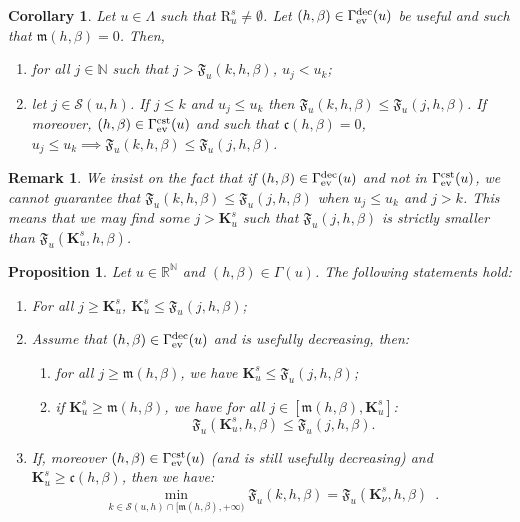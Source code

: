 \documentclass{article}
\def\funset{\Gamma}
\def\fmong{\funset_{{\rm ev}}^{\rm dec}}
\def\fcste{\funset_{{\rm ev}}^{\rm cst}}
\def\mon{\mathfrak{m}}
\def\cst{\mathfrak{c}}
\def\Fu{\mathfrak{F}_u}
\def\rr{\mathbb R}
\def\nn{\mathbb N}
\def\bigks{\mathbf{K}^s}
\def\gls#1{{\mathrm R}_{#1}}
\def\gsls#1{\gls{#1}^s}
\def\res{\mathcal{S}}
\newtheorem{prop}{Proposition}
\newtheorem{coro}{Corollary}
\newtheorem{remark}{Remark}
\def\red#1{#1}
\def\blue#1{#1}
\begin{document}
	\begin{coro}
		\label{mainpropmon}
		Let $u\in\Lambda$ such that $\gsls{u}\neq \emptyset$. Let \blue{$(h,\beta)\in \fmong(u)$ be useful and such that $\mon(h,\beta)=0$}. Then,
		\begin{enumerate}
			\item for all $j\in\nn$ such that $j>\Fu(k,h,\beta)$, $u_j<u_k$;
			\item let $j\in\res(u,h)$. If $j\leq k$ and $u_j\leq u_k$ then $\Fu(k,h,\beta)\leq \Fu(j,h,\beta)$. If moreover, \blue{$(h,\beta)\in \fcste(u)$ and such that $\cst(h,\beta)=0$}, $u_j\leq u_k\implies \Fu(k,h,\beta)\leq \Fu(j,h,\beta)$.
		\end{enumerate}
	\end{coro}
	\begin{remark}
		We insist on the fact that if $(h,\beta)\in \fmong(u)$ and not in $\fcste(u)$, we cannot guarantee that $\Fu(k,h,\beta)\leq \Fu(j,h,\beta)$ when $u_j\leq u_k$ and $j>k$. This means \red{that} we may find some $j>\bigks_u$ such that $\Fu(j,h,\beta)$ is strictly smaller than $\Fu(\bigks_u,h,\beta)$.  
	\end{remark}
	
	\begin{prop}
		\label{inter}
		Let $u\in\rr^\nn$ and $(h,\beta)\in\funset(u)$. The following statements hold:
		\begin{enumerate}
			\item For all $j\geq \bigks_u$, $\bigks_u\leq \Fu(j,h,\beta)$;
			\item Assume that $(h,\beta)\in \fmong(u)$ and is usefully decreasing, then:
			\begin{enumerate}
				\item for all $j\geq \mon(h,\beta)$, we have $\bigks_u\leq \Fu(j,h,\beta)$;
				\item if $\bigks_u\geq \mon(h,\beta)$, we have for all $j\in [\mon(h,\beta),\bigks_u]$:
				\[
				\Fu(\bigks_u,h,\beta)\leq \Fu(j,h,\beta) .
				\] 
			\end{enumerate}
			\item If, moreover $(h,\beta)\in \fcste(u)$ (and is still usefully decreasing) and $\bigks_u\geq \cst(h,\beta)$, then we have: 
			\[
			\min_{k\in\res(u,h)\cap [\mon(h,\beta),+\infty)} \Fu(k,h,\beta)=\Fu(\bigks_\nu,h,\beta)\enspace .
			\]
		\end{enumerate}
	\end{prop}
	
\end{document}
